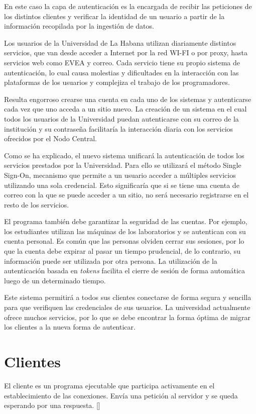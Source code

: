 En este caso la capa de autenticación es la encargada de recibir las peticiones de los distintos clientes y verificar la identidad de un usuario a partir de la información recopilada por la ingestión de datos.

Los usuarios de la Universidad de La Habana  utilizan diariamente distintos servicios, que van desde acceder a Internet por la red WI-FI o por proxy, hasta servicios web como EVEA y correo. Cada servicio tiene su propio sistema de autenticación, lo cual causa molestias y dificultades en la interacción con las plataformas de los usuarios y complejiza el trabajo de los programadores.

Resulta engorroso crearse una cuenta en cada uno de los sistemas y autenticarse cada vez que uno acceda a un sitio nuevo. La creación de un sistema en el cual todos los usuarios de la Universidad puedan autenticarse con su correo de la institución y su contraseña facilitaría la interacción diaria con los servicios ofrecidos por el Nodo Central.


Como se ha explicado, el nuevo sistema unificará la autenticación de todos los servicios prestados por la Universidad. Para ello se utilizará el método Single Sign-On, mecanismo que permite a un usuario acceder a múltiples servicios utilizando una sola credencial. Esto significaría que si se tiene una cuenta de correo con la que se puede acceder a un sitio, no será necesario registrarse en el resto de los servicios.

El programa también debe garantizar la seguridad de las cuentas. Por ejemplo, los estudiantes utilizan las máquinas de los laboratorios y se autentican con su cuenta personal. Es común que las personas olviden cerrar sus sesiones, por lo que la cuenta debe expirar al pasar un tiempo prudencial, de lo contrario, su información puede ser utilizada por otra persona. La utilización de la autenticación basada en \textit{tokens} facilita el cierre de sesión de forma automática luego de un determinado tiempo.

Este sistema permitirá a todos sus clientes conectarse de forma segura y sencilla para que verifiquen las credenciales de sus usuarios. La universidad actualmente ofrece muchos servicios, por lo que se debe encontrar la forma óptima de migrar los clientes a la nueva forma de autenticar.


\section{Clientes} \label{client-layer}
El cliente es un programa ejecutable que participa activamente en el establecimiento de las conexiones. Envía una petición al servidor y se queda esperando por una respuesta. [\cite{lizama2016redes}]


